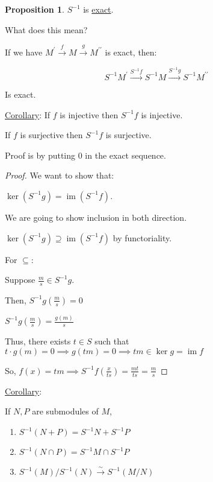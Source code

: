\documentclass{article}
\theoremstyle{definition}
\newtheorem{proposition}{Proposition}
\newcommand{\im}{\operatorname{im}}
\begin{document}
\begin{proposition}
    \(S ^{-1} \) is \underline{exact}.
\end{proposition}

What does this mean?

If we have \(M^{\prime} \overset{f}{\to } M \overset{g}{\to } M^{\prime\prime} \) is exact, then:

\[
    S ^{-1} M^{\prime} \overset{S ^{-1} f}{\to } S ^{-1} M \overset{S ^{-1} g}{\to} S ^{-1} M^{\prime\prime} 
\]

Is exact.

\underline{Corollary}: If \(f\) is injective then \(S ^{-1} f\) is injective.

If \(f\) is surjective then \(S ^{-1} f\) is surjective.

Proof is by putting \(0\) in the exact sequence.

\begin{proof}
    We want to show that:

    \(\ker (S ^{-1} g) = \im (S ^{-1} f)\).

    We are going to show inclusion in both direction.

    \(\ker (S ^{-1} g) \supseteq \im (S ^{-1} f)\) by functoriality.

    For \(\subseteq \):

    Suppose \(\frac{m}{s}\in S ^{-1} g\).

    Then, \(S ^{-1} g (\frac{m}{s}) = 0\) 

    \(S ^{-1} g(\frac{m}{s}) = \frac{g(m)}{s}\)
    
    Thus, there exists \(t\in S\) such that \(t\cdot g(m) = 0 \implies g(tm) = 0 \implies tm \in\ker g = \im f\)
    
    So, \(f(x) = tm \implies S ^{-1} f(\frac{x}{ts}) = \frac{mt}{ts}=\frac{m}{s}\) 

\end{proof}

\underline{Corollary}:

If \(N,P\) are submodules of \(M\),

\begin{enumerate}
    \item \(S ^{-1} (N + P) = S ^{-1} N + S ^{-1} P\) 
    \item \(S ^{-1} (N \cap P) = S ^{-1} M \cap S ^{-1} P\) 
    \item \(S ^{-1} (M) / S ^{-1} (N) \overset{\sim}{\to } S ^{-1} (M / N)\) 
\end{enumerate}
\end{document}
